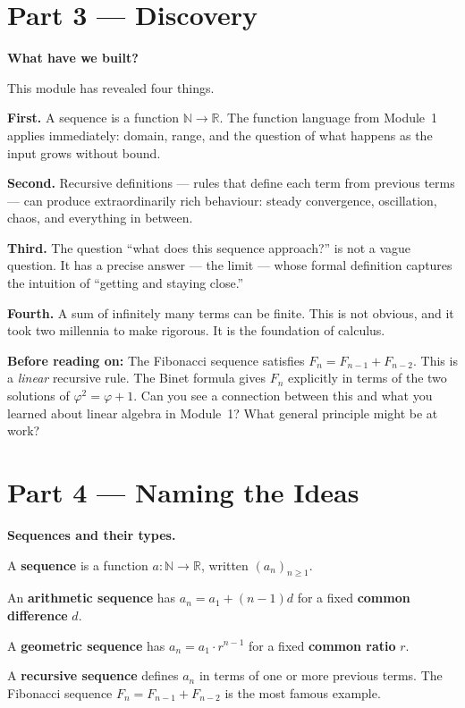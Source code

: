 \documentclass[12pt, a4paper]{article}
\begin{document}
\section{Part 3 \texorpdfstring{---}{--} Discovery}

\begin{discoverybox}
\textbf{What have we built?}

This module has revealed four things.

\medskip
\textbf{First.} A sequence is a function $\mathbb{N} \to \mathbb{R}$. The function language from Module~1 applies immediately: domain, range, and the question of what happens as the input grows without bound.

\medskip
\textbf{Second.} Recursive definitions --- rules that define each term from previous terms --- can produce extraordinarily rich behaviour: steady convergence, oscillation, chaos, and everything in between.

\medskip
\textbf{Third.} The question ``what does this sequence approach?'' is not a vague question. It has a precise answer --- the limit --- whose formal definition captures the intuition of ``getting and staying close.''

\medskip
\textbf{Fourth.} A sum of infinitely many terms can be finite. This is not obvious, and it took two millennia to make rigorous. It is the foundation of calculus.

\medskip
\textbf{Before reading on:} The Fibonacci sequence satisfies $F_n = F_{n-1} + F_{n-2}$. This is a \emph{linear} recursive rule. The Binet formula gives $F_n$ explicitly in terms of the two solutions of $\varphi^2 = \varphi + 1$. Can you see a connection between this and what you learned about linear algebra in Module~1? What general principle might be at work?
\end{discoverybox}

\section{Part 4 \texorpdfstring{---}{--} Naming the Ideas}

\begin{namebox}
\textbf{Sequences and their types.}

A \textbf{sequence} is a function $a : \mathbb{N} \to \mathbb{R}$, written $(a_n)_{n \geq 1}$.

An \textbf{arithmetic sequence} has $a_n = a_1 + (n-1)d$ for a fixed \textbf{common difference} $d$.

A \textbf{geometric sequence} has $a_n = a_1 \cdot r^{n-1}$ for a fixed \textbf{common ratio} $r$.

A \textbf{recursive sequence} defines $a_n$ in terms of one or more previous terms. The Fibonacci sequence $F_n = F_{n-1} + F_{n-2}$ is the most famous example.
\end{namebox}
\end{document}
